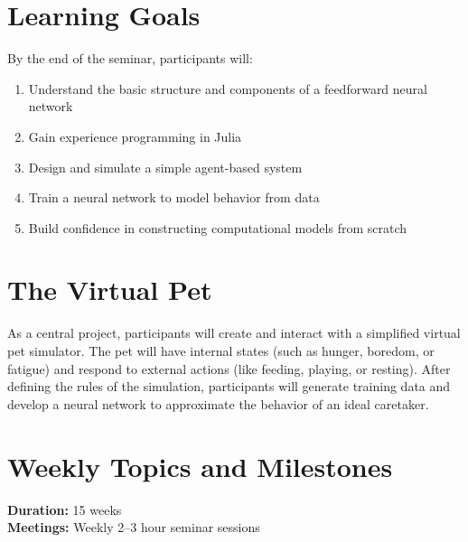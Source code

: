 \documentclass[10pt]{book}
\begin{document}
\section{Learning Goals}

By the end of the seminar, participants will:
\begin{enumerate}[label=\arabic*.]
    \item Understand the basic structure and components of a feedforward neural network
    \item Gain experience programming in Julia
    \item Design and simulate a simple agent-based system
    \item Train a neural network to model behavior from data
    \item Build confidence in constructing computational models from scratch
\end{enumerate}

\section{The Virtual Pet}

As a central project, participants will create and interact with a simplified virtual pet simulator. The pet will have internal states (such as hunger, boredom, or fatigue) and respond to external actions (like feeding, playing, or resting). After defining the rules of the simulation, participants will generate training data and develop a neural network to approximate the behavior of an ideal caretaker.

\section{Weekly Topics and Milestones}

\textbf{Duration:} 15 weeks \\
\textbf{Meetings:} Weekly 2--3 hour seminar sessions
\end{document}
